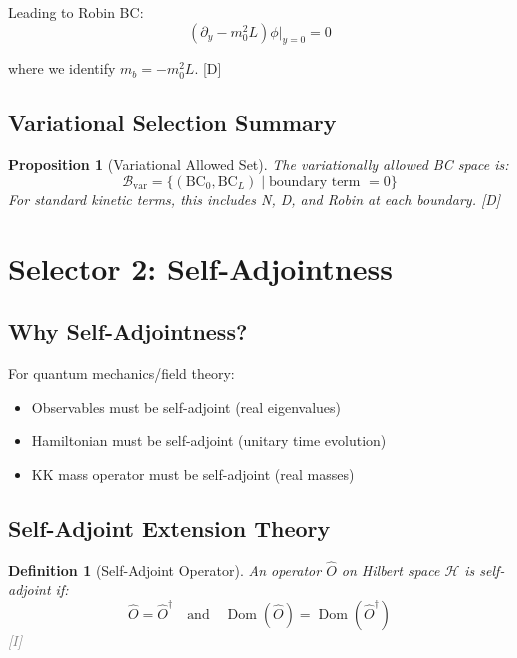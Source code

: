 \documentclass[11pt,a4paper]{article}
\newtheorem{proposition}[theorem]{Proposition}
\newtheorem{definition}[theorem]{Definition}
\newcommand{\tagD}{\textcolor{blue!70!black}{[D]}}
\newcommand{\tagI}{\textcolor{gray}{[I]}}
\DeclareMathOperator{\Dom}{Dom}
\begin{document}
Leading to Robin BC:
\begin{equation}
\label{eq:robin-derived}
(\partial_y - m_0^2 L) \phi \big|_{y=0} = 0
\end{equation}

where we identify $m_b = -m_0^2 L$. \tagD

\subsection{Variational Selection Summary}

\begin{proposition}[Variational Allowed Set]
\label{prop:var-allowed}
The variationally allowed BC space is:
\begin{equation}
\label{eq:var-allowed}
\mathcal{B}_{\text{var}} = \{(\text{BC}_0, \text{BC}_L) \mid \text{boundary term } = 0\}
\end{equation}
For standard kinetic terms, this includes N, D, and Robin at each boundary. \tagD
\end{proposition}

\section{Selector 2: Self-Adjointness}

\subsection{Why Self-Adjointness?}

For quantum mechanics/field theory:
\begin{itemize}
    \item Observables must be self-adjoint (real eigenvalues)
    \item Hamiltonian must be self-adjoint (unitary time evolution)
    \item KK mass operator must be self-adjoint (real masses)
\end{itemize}

\subsection{Self-Adjoint Extension Theory}

\begin{definition}[Self-Adjoint Operator]
\label{def:sa}
An operator $\hat{O}$ on Hilbert space $\mathcal{H}$ is self-adjoint if:
\begin{equation}
\label{eq:sa-def}
\hat{O} = \hat{O}^\dagger \quad \text{and} \quad \Dom(\hat{O}) = \Dom(\hat{O}^\dagger)
\end{equation}
\tagI
\end{definition}
\end{document}
